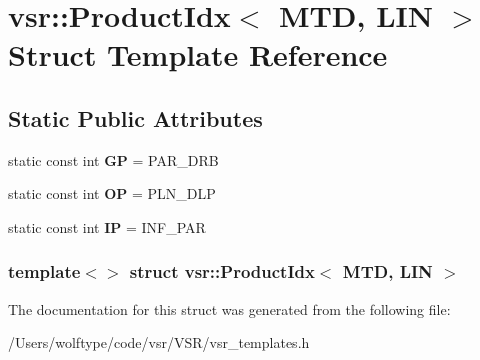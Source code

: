 \hypertarget{structvsr_1_1_product_idx_3_01_m_t_d_00_01_l_i_n_01_4}{\section{vsr\-:\-:Product\-Idx$<$ M\-T\-D, L\-I\-N $>$ Struct Template Reference}
\label{structvsr_1_1_product_idx_3_01_m_t_d_00_01_l_i_n_01_4}
}
\subsection*{Static Public Attributes}
\begin{DoxyCompactItemize}
\item 
\hypertarget{structvsr_1_1_product_idx_3_01_m_t_d_00_01_l_i_n_01_4_ab95f25e6156194222610e5dcbf5a745b}{static const int {\bfseries G\-P} = P\-A\-R\-\_\-\-D\-R\-B}\label{structvsr_1_1_product_idx_3_01_m_t_d_00_01_l_i_n_01_4_ab95f25e6156194222610e5dcbf5a745b}

\item 
\hypertarget{structvsr_1_1_product_idx_3_01_m_t_d_00_01_l_i_n_01_4_a14cf91f31a20da39139ed32b9e374e11}{static const int {\bfseries O\-P} = P\-L\-N\-\_\-\-D\-L\-P}\label{structvsr_1_1_product_idx_3_01_m_t_d_00_01_l_i_n_01_4_a14cf91f31a20da39139ed32b9e374e11}

\item 
\hypertarget{structvsr_1_1_product_idx_3_01_m_t_d_00_01_l_i_n_01_4_a4ca7fa141b91a9a1beca6eb08b23340a}{static const int {\bfseries I\-P} = I\-N\-F\-\_\-\-P\-A\-R}\label{structvsr_1_1_product_idx_3_01_m_t_d_00_01_l_i_n_01_4_a4ca7fa141b91a9a1beca6eb08b23340a}

\end{DoxyCompactItemize}
\subsubsection*{template$<$$>$ struct vsr\-::\-Product\-Idx$<$ M\-T\-D, L\-I\-N $>$}



The documentation for this struct was generated from the following file\-:\begin{DoxyCompactItemize}
\item 
/\-Users/wolftype/code/vsr/\-V\-S\-R/vsr\-\_\-templates.\-h\end{DoxyCompactItemize}
